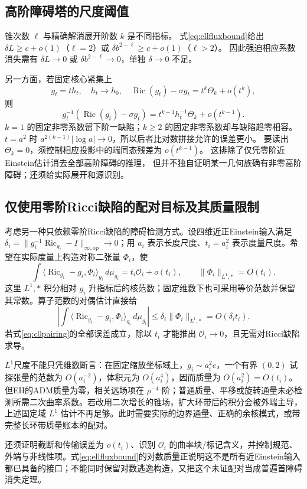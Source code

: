 \documentclass[UTF8,a4paper,11pt,fontset=fandol]{ctexart}
\numberwithin{equation}{section}
\theoremstyle{definition}
\newcommand{\Ric}{\operatorname{Ric}}
\newcommand{\op}{\mathrm{op}}
\begin{document}
\subsection{高阶障碍塔的尺度阈值}
锥次数 $\ell$ 与精确解消展开阶数 $k$ 是不同指标。
式\eqref{eq:ellfluxbound}给出
$\delta L\ge c+o(1)$（$\ell=2$）或
$\delta b^{2-\ell}\ge c+o(1)$（$\ell>2$）。
因此强迫相应系数消失需有 $\delta L\to0$ 或
$\delta b^{2-\ell}\to0$，单独 $\delta\to0$ 不足。

另一方面，若固定核心紧集上
\[
g_t=t h_t,\quad h_t\to h_0,\quad
\Ric(g_t)-\sigma g_t=t^k\Theta_k+o(t^k),
\]
则
\[
g_t^{-1}(\Ric(g_t)-\sigma g_t)
=t^{k-1}h_t^{-1}\Theta_k+o(t^{k-1}).
\]
$k=1$ 的固定非零系数留下阶一缺陷；$k\ge2$ 的固定非零系数却与缺陷趋零相容。
$t=a^2$ 时 $a^{2(k-1)}|\log a|\to0$，所以后者比对数拼接允许的误差更小。
要读出 $\Theta_k=0$，须控制相应投影中的端同态残差为 $o(t^{k-1})$。
这排除了仅凭零阶近Einstein估计消去全部高阶障碍的推理，
但并不独自证明某一几何族确有非零高阶障碍；还须给实际展开和源识别。

\subsection{仅使用零阶Ricci缺陷的配对目标及其质量限制}\label{sec:c0pairing}
考虑另一种只依赖零阶Ricci缺陷的障碍检测方式。设四维近正Einstein输入满足 $\delta_i=\|g_i^{-1}\Ric_{g_i}-I\|_{\infty,\op}\to0$；用 $a_i$ 表示长度尺度、$t_i=a_i^2$ 表示度量尺度。希望在实际度量上构造对称二张量 $\Phi_i$，使
\begin{equation}\label{eq:c0pairing}
\int\langle\Ric_{g_i}-g_i,\Phi_i\rangle_{g_i}\,d\mu_{g_i}
=t_i\mathcal O_i+o(t_i),\qquad
\|\Phi_i\|_{L^1,*}=O(t_i).
\end{equation}
这里 $L^1,*$ 积分相对 $g_i$ 升指标后的核范数；固定维数下也可采用等价范数并保留其常数。算子范数的对偶估计直接给
\[
\left|\int\langle\Ric_{g_i}-g_i,\Phi_i\rangle_{g_i}\,d\mu_{g_i}\right|
\le\delta_i\|\Phi_i\|_{L^1,*}=O(\delta_it_i).
\]
若式\eqref{eq:c0pairing}的全部误差成立，除以 $t_i$ 才能推出 $\mathcal O_i\to0$，且无需对Ricci缺陷求导。

$L^1$尺度不能只凭维数断言：在固定缩放坐标域上，$g_i\sim a_i^2e$，一个有界 $(0,2)$ 试探张量的范数为 $O(a_i^{-2})$，体积元为 $O(a_i^4)$，因而质量为 $O(a_i^2)=O(t_i)$。但EH的ADM质量为零，相关远场项在 $\rho^{-4}$ 阶；普通质量、平移或旋转通量未必检测所需二次曲率系数。若改用二次增长的锥场，扩大环带后的积分会被外端主导，上述固定域 $L^1$ 估计不再足够。此时需要实际的边界通量、正确的余核模式，或带完整长环带质量账本的配对。

还须证明截断和传输误差为 $o(t_i)$、识别 $\mathcal O_i$ 的曲率块/标记含义，并控制规范、外端与非线性项。式\eqref{eq:ellfluxbound}的对数质量正说明这不是所有近Einstein输入都已具备的接口；不能同时保留对数逃逸构造，又把这个未证配对当成普遍首障碍消失定理。
\end{document}
